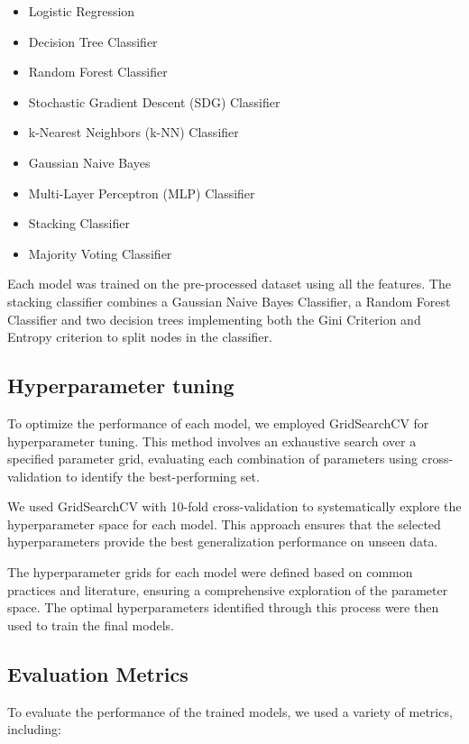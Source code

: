 \documentclass[twocolumn, 9pt]{extarticle}
\begin{document}
\begin{itemize}
    \item Logistic Regression
    \item Decision Tree Classifier
    \item Random Forest Classifier
    \item Stochastic Gradient Descent (SDG) Classifier
    \item k-Nearest Neighbors (k-NN) Classifier
    \item Gaussian Naive Bayes
    \item Multi-Layer Perceptron (MLP) Classifier 
    \item Stacking Classifier
    \item Majority Voting Classifier
\end{itemize}

Each model was trained on the pre-processed dataset using all the features. The stacking classifier combines a Gaussian Naive Bayes Classifier, a Random Forest Classifier and two decision trees implementing both the Gini Criterion and Entropy criterion to split nodes in the classifier.

\subsection{Hyperparameter tuning}
To optimize the performance of each model, we employed GridSearchCV for hyperparameter tuning. This method involves an exhaustive search over a specified parameter grid, evaluating each combination of parameters using cross-validation to identify the best-performing set.


We used GridSearchCV with 10-fold cross-validation to systematically explore the hyperparameter space for each model. This approach ensures that the selected hyperparameters provide the best generalization performance on unseen data.


The hyperparameter grids for each model were defined based on common practices and literature, ensuring a comprehensive exploration of the parameter space. The optimal hyperparameters identified through this process were then used to train the final models.

\subsection{Evaluation Metrics}
To evaluate the performance of the trained models, we used a variety of metrics, including:
\end{document}
